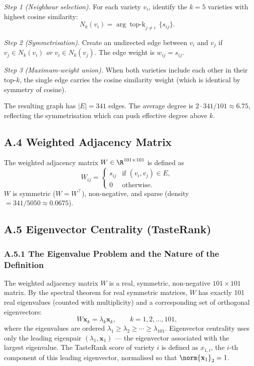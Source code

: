 \documentclass[11pt]{article}
\begin{document}
\textit{Step 1 (Neighbour selection).} For each variety $v_i$, identify the $k = 5$ varieties with highest cosine similarity:
\[
N_k(v_i) = \arg\!\!\!\!\!\!\!\!\!\!\!\mathop{\mathrm{top\text{-}k}}_{j \neq i}\, \{ s_{ij} \}.
\]

\textit{Step 2 (Symmetrisation).} Create an undirected edge between $v_i$ and $v_j$ if $v_j \in N_k(v_i)$ \emph{or} $v_i \in N_k(v_j)$. The edge weight is $w_{ij} = s_{ij}$.

\textit{Step 3 (Maximum-weight union).} When both varieties include each other in their top-$k$, the single edge carries the cosine similarity weight (which is identical by symmetry of cosine).

The resulting graph has $|E| = 341$ edges. The average degree is $2 \cdot 341 / 101 \approx 6.75$, reflecting the symmetrisation which can push effective degree above $k$.

\subsection*{A.4 Weighted Adjacency Matrix}
The weighted adjacency matrix $W \in \R^{101 \times 101}$ is defined as
\[
W_{ij} = \begin{cases} s_{ij} & \text{if } (v_i, v_j) \in E, \\ 0 & \text{otherwise}. \end{cases}
\]
$W$ is symmetric ($W = W^\top$), non-negative, and sparse (density $= 341/5050 \approx 0.0675$).

\subsection*{A.5 Eigenvector Centrality (TasteRank)}

\subsubsection*{A.5.1 The Eigenvalue Problem and the Nature of the Definition}
The weighted adjacency matrix $W$ is a real, symmetric, non-negative $101 \times 101$ matrix. By the spectral theorem for real symmetric matrices, $W$ has exactly 101 real eigenvalues (counted with multiplicity) and a corresponding set of orthogonal eigenvectors:
\[
W \mathbf{x}_k = \lambda_k \mathbf{x}_k, \qquad k = 1, 2, \ldots, 101,
\]
where the eigenvalues are ordered $\lambda_1 \geq \lambda_2 \geq \cdots \geq \lambda_{101}$. Eigenvector centrality uses only the leading eigenpair $(\lambda_1, \mathbf{x}_1)$ --- the eigenvector associated with the largest eigenvalue. The TasteRank score of variety $i$ is defined as $x_{1,i}$, the $i$-th component of this leading eigenvector, normalised so that $\norm{\mathbf{x}_1}_2 = 1$.
\end{document}

